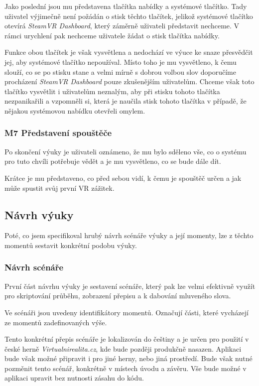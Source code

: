 Jako poslední jsou mu představena tlačítka nabídky a systémové tlačítko.
Tady uživatel výjimečně není požádán o stisk těchto tlačítek, jelikož
systémové tlačítko otevírá \emph{SteamVR Dashboard}, který záměrně
uživateli představit nechceme. V rámci urychlení pak nechceme uživatele
žádat o stisk tlačítka nabídky.

Funkce obou tlačítek je však vysvětlena a nedochází ve výuce ke snaze
přesvědčit jej, aby systémové tlačítko nepoužíval. Místo toho je mu
vysvětleno, k čemu slouží, co se po stisku stane a velmi mírně s dobrou
volbou slov doporučíme procházení \emph{SteamVR Dashboard} pouze
zkušenějším uživatelům. Chceme však toto tlačítko vysvětlit i uživatelům
neznalým, aby při stisku tohoto tlačítka nezpanikařili a vzpomněli si,
která je naučila stisk tohoto tlačítka v případě, že nějakou systémovou
nabídku otevřeli omylem.

\subsubsection{M7 Představení
spouštěče}\label{m7-pux159edstavenuxed-spouux161tux11bux10de}

Po skončení výuky je uživateli oznámeno, že mu bylo sděleno vše, co o
systému pro tuto chvíli potřebuje vědět a je mu vysvětleno, co se bude
dále dít.

Krátce je mu představeno, co před sebou vidí, k čemu je spouštěč určen a
jak může spustit svůj první VR zážitek.

\subsection{Návrh výuky}\label{nuxe1vrh-vuxfduky}

Poté, co jsem specifikoval hrubý návrh scénáře výuky a její momenty, lze
z těchto momentů sestavit konkrétní podobu výuky.

\subsubsection{Návrh scénáře}\label{nuxe1vrh-scuxe9nuxe1ux159e}

První část návrhu výuky je sestavení scénáře, který pak lze velmi
efektivně využít pro skriptování průběhu, zobrazení přepisu a k dabování
mluveného slova.

Ve scénáři jsou uvedeny identifikátory momentů. Označují části, které
vycházejí ze momentů zadefinovaných výše.

Tento konkrétní přepis scénáře je lokalizován do češtiny a je určen pro
použití v české herně \emph{Virtualnirealita.cz}, kde bude později
produkčně nasazen. Aplikaci bude však možné připravit i pro jiné herny,
nebo jiná prostředí. Bude však nutné pozměnit tento scénář, konkrétně v
místech úvodu a závěru. Vše bude možné v aplikaci upravit bez nutnosti
zásahu do kódu.

